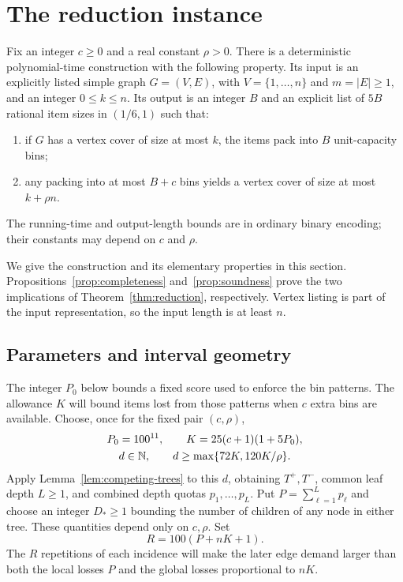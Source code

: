 \section{The reduction instance}\label{sec:instance}

\begin{theorem}\label{thm:reduction}
Fix an integer $c\ge0$ and a real constant $\rho>0$. There is a
deterministic polynomial-time construction with the following property.
Its input is an explicitly listed simple graph $G=(V,E)$, with
$V=\{1,\ldots,n\}$ and $m=|E|\ge1$, and an integer $0\le k\le n$.
Its output is an integer $B$ and an explicit list of $5B$ rational item
sizes in $(1/6,1)$ such that:
\begin{enumerate}
 \item if $G$ has a vertex cover of size at most $k$, the items pack into
       $B$ unit-capacity bins;
 \item any packing into at most $B+c$ bins yields a vertex cover of size
       at most $k+\rho n$.
\end{enumerate}
The running-time and output-length bounds are in ordinary binary
encoding; their constants may depend on $c$ and $\rho$.
\end{theorem}

We give the construction and its elementary properties in this section.
Propositions~\ref{prop:completeness} and~\ref{prop:soundness} prove the
two implications of Theorem~\ref{thm:reduction}, respectively. Vertex
listing is part of the input representation, so the input length is at
least $n$.

\subsection{Parameters and interval geometry}

The integer $P_0$ below bounds a fixed score used to enforce the bin
patterns. The allowance $K$ will bound items lost from those patterns
when $c$ extra bins are available. Choose, once for the fixed pair
$(c,\rho)$,
\begin{equation}\label{eq:parameters}
 \begin{gathered}
  P_0=100^{11},\qquad K=25(c+1)(1+5P_0),\\
  d\in\mathbb N,\qquad d\ge\max\{72K,120K/\rho\}.
 \end{gathered}
\end{equation}
Apply Lemma~\ref{lem:competing-trees} to this $d$, obtaining
$T^+,T^-$, common leaf depth $L\ge1$, and combined depth quotas
$p_1,\ldots,p_L$. Put $P=\sum_{\ell=1}^L p_\ell$ and choose an integer
$D_*\ge1$ bounding the number of children of any node in either tree.
These quantities depend only on $c,\rho$. Set
\[
 R=100(P+nK+1).
\]
The $R$ repetitions of each incidence will make the later edge demand
larger than both the local losses $P$ and the global losses proportional
to $nK$.

